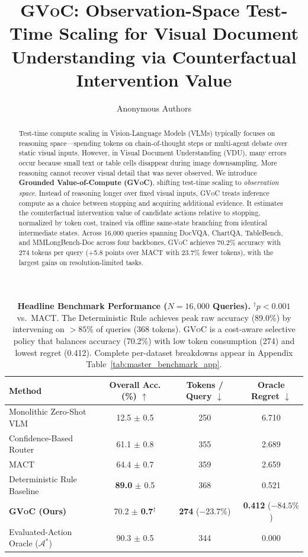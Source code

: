 \documentclass[11pt]{article}
\title{\textsc{GVoC}: Observation-Space Test-Time Scaling for Visual Document Understanding via Counterfactual Intervention Value}
\author{Anonymous Authors}
\begin{document}
\maketitle

\begin{abstract}
Test-time compute scaling in Vision-Language Models (VLMs) typically focuses on reasoning space---spending tokens on chain-of-thought steps or multi-agent debate over static visual inputs. However, in Visual Document Understanding (VDU), many errors occur because small text or table cells disappear during image downsampling. More reasoning cannot recover visual detail that was never observed. We introduce \textbf{Grounded Value-of-Compute (\textsc{GVoC})}, shifting test-time scaling to \textit{observation space}. Instead of reasoning longer over fixed visual inputs, \textsc{GVoC} treats inference compute as a choice between stopping and acquiring additional evidence. It estimates the counterfactual intervention value of candidate actions relative to stopping, normalized by token cost, trained via offline same-state branching from identical intermediate states. Across 16,000 queries spanning DocVQA, ChartQA, TableBench, and MMLongBench-Doc across four backbones, \textsc{GVoC} achieves 70.2\% accuracy with 274 tokens per query (+5.8 points over MACT with 23.7\% fewer tokens), with the largest gains on resolution-limited tasks.
\end{abstract}
\begin{table}[t]
\centering
\small
\renewcommand{\arraystretch}{0.88}
\begin{tabular}{lccc}
\toprule
\textbf{Method} & \textbf{Overall Acc. (\%)} $\uparrow$ & \textbf{Tokens / Query} $\downarrow$ & \textbf{Oracle Regret} $\downarrow$ \\
\midrule
Monolithic Zero-Shot VLM & 12.5 $\pm$ 0.5 & 250 & 6.710 \\
Confidence-Based Router & 61.1 $\pm$ 0.8 & 355 & 2.689 \\
MACT \citep{yu2025visual} & 64.4 $\pm$ 0.7 & 359 & 2.659 \\
Deterministic Rule Baseline & \textbf{89.0} $\pm$ 0.5 & 368 & 0.521 \\
\midrule
\textbf{\textsc{GVoC} (Ours)} & 70.2 $\pm$ \textbf{0.7}$^\dagger$ & \textbf{274} ($-23.7\%$) & \textbf{0.412} ($-84.5\%$) \\
\midrule
Evaluated-Action Oracle ($\mathcal{A}^*$) & 90.3 $\pm$ 0.5 & 344 & 0.000 \\
\bottomrule
\end{tabular}
\vspace{-2mm}
\caption{\textbf{Headline Benchmark Performance ($N = 16,000$ Queries).} $^\dagger p < 0.001$ vs.\ MACT. The Deterministic Rule achieves peak raw accuracy (89.0\%) by intervening on $>85\%$ of queries (368 tokens). \textsc{GVoC} is a cost-aware selective policy that balances accuracy (70.2\%) with low token consumption (274) and lowest regret (0.412). Complete per-dataset breakdowns appear in Appendix Table~\ref{tab:master_benchmark_app}.}
\label{tab:headline_benchmark}
\vspace{2mm}
\end{table}
\end{document}
